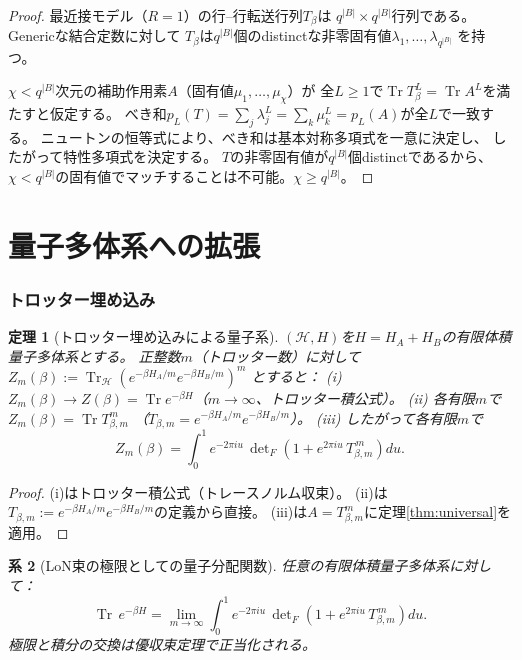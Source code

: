 \documentclass[12pt]{article}
\theoremstyle{plain}
\newtheorem{theorem}{定理}[section]
\newtheorem{corollary}[theorem]{系}
\theoremstyle{definition}
\numberwithin{equation}{section}
\DeclareMathOperator{\Tr}{Tr}
\begin{document}
\begin{proof}
最近接モデル（$R=1$）の行--行転送行列$T_\beta$は
$q^{|B|}\times q^{|B|}$行列である。Genericな結合定数に対して
$T_\beta$は$q^{|B|}$個のdistinctな非零固有値$\lambda_1,\ldots,\lambda_{q^{|B|}}$
を持つ。

$\chi<q^{|B|}$次元の補助作用素$A$（固有値$\mu_1,\ldots,\mu_\chi$）が
全$L\geq 1$で$\Tr T_\beta^L=\Tr A^L$を満たすと仮定する。
べき和$p_L(T)=\sum_j\lambda_j^L=\sum_k\mu_k^L=p_L(A)$が全$L$で一致する。
ニュートンの恒等式により、べき和は基本対称多項式を一意に決定し、
したがって特性多項式を決定する。
$T$の非零固有値が$q^{|B|}$個distinctであるから、
$\chi<q^{|B|}$の固有値でマッチすることは不可能。$\chi\geq q^{|B|}$。
\end{proof}


\part{量子多体系への拡張}

\section{トロッター埋め込み}\label{sec:trotter}

\begin{theorem}[トロッター埋め込みによる量子系]\label{thm:trotter}
$(\mathcal{H},H)$を$H=H_A+H_B$の有限体積量子多体系とする。
正整数$m$（トロッター数）に対して
$Z_m(\beta) := \Tr_{\mathcal{H}}(e^{-\beta H_A/m}e^{-\beta H_B/m})^m$
とすると：
(i) $Z_m(\beta)\to Z(\beta)=\Tr e^{-\beta H}$（$m\to\infty$、トロッター積公式）。
(ii) 各有限$m$で$Z_m(\beta)=\Tr T_{\beta,m}^m$
（$T_{\beta,m}=e^{-\beta H_A/m}e^{-\beta H_B/m}$）。
(iii) したがって各有限$m$で
\begin{equation}
\boxed{Z_m(\beta) = \int_0^1 e^{-2\pi iu}\,
\det\nolimits_F\!\left(1+e^{2\pi iu}\,T_{\beta,m}^{\,m}\right)du.}
\end{equation}
\end{theorem}

\begin{proof}
(i)はトロッター積公式（トレースノルム収束）。
(ii)は$T_{\beta,m}:=e^{-\beta H_A/m}e^{-\beta H_B/m}$の定義から直接。
(iii)は$A=T_{\beta,m}^m$に定理\ref{thm:universal}を適用。
\end{proof}

\begin{corollary}[LoN束の極限としての量子分配関数]\label{cor:quantumlimit}
任意の有限体積量子多体系に対して：
\begin{equation}
\Tr\,e^{-\beta H}
= \lim_{m\to\infty}\int_0^1 e^{-2\pi iu}\,
\det\nolimits_F\!\left(1+e^{2\pi iu}\,T_{\beta,m}^{\,m}\right)du.
\end{equation}
極限と積分の交換は優収束定理で正当化される。
\end{corollary}
\end{document}
